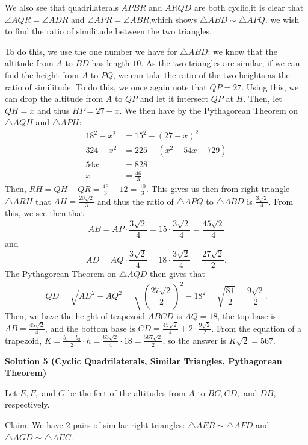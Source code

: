 \begin{enumerate}
 We also see that quadrilaterals $APBR$ and $ARQD$ are both cyclic,it is clear that $\angle AQR =\angle ADR$ and $\angle APR =\angle ABR$,which shows $\triangle ABD \sim \triangle APQ$. we wish to find the ratio of similitude between the two triangles.

 To do this, we use the one number we have for $\triangle ABD$: we know that the altitude from $A$ to $BD$ has length $10$. As the two triangles are similar, if we can find the height from $A$ to $PQ$, we can take the ratio of the two heights as the ratio of similitude. To do this, we once again note that $QP = 27$. Using this, we can drop the altitude from $A$ to $QP$ and let it intersect $QP$ at $H$. Then, let $QH = x$ and thus $HP=27-x$. We then have by the Pythagorean Theorem on $\triangle AQH$ and $\triangle APH$:
 \begin{align*} 18^2 - x^2 &= 15^2 - (27-x)^2 \\ 324 - x^2 &= 225 - (x^2-54x+729) \\ 54x &= 828 \\ x &= \frac{46}{3}. \end{align*}
Then, $RH = QH - QR = \frac{46}{3} - 12 = \frac{10}{3}$. This gives us then from right triangle $\triangle ARH$ that $AH = \frac{20\sqrt{2}}{3}$ and thus the ratio of $\triangle APQ$ to $\triangle ABD$ is $\frac{3\sqrt{2}}{4}$. From this, we see then that 
 \[AB = AP \cdot \frac{3\sqrt{2}}{4} = 15 \cdot \frac{3\sqrt{2}}{4} = \frac{45\sqrt{2}}{4}\] and 
 \[AD = AQ \cdot \frac{3\sqrt{2}}{4} = 18 \cdot \frac{3\sqrt{2}}{4} = \frac{27\sqrt{2}}{2}.\] The Pythagorean Theorem on $\triangle AQD$ then gives that 
 \[QD = \sqrt{AD^2 - AQ^2} = \sqrt{\left(\frac{27\sqrt{2}}{2}\right)^2 - 18^2} = \sqrt{\frac{81}{2}} = \frac{9\sqrt{2}}{2}.\]Then, we have the height of trapezoid $ABCD$ is $AQ = 18$, the top base is $AB = \frac{45\sqrt{2}}{4}$, and the bottom base is $CD = \frac{45\sqrt{2}}{4} + 2\cdot\frac{9\sqrt{2}}{2}$. From the equation of a trapezoid, $K = \frac{b_1+b_2}{2} \cdot h = \frac{63\sqrt{2}}{4} \cdot 18 = \frac{567\sqrt{2}}{2}$, so the answer is $K\sqrt{2} = \boxed{567}$.

 



\textbf{Solution 5 (Cyclic Quadrilaterals, Similar Triangles, Pythagorean Theorem)}

Let $E,F,$ and $G$ be the feet of the altitudes from $A$ to $BC,CD,$ and $DB$, respectively.

 Claim: We have $2$ pairs of similar right triangles: $\triangle AEB \sim \triangle AFD$ and $\triangle AGD \sim \triangle AEC$.


\end{enumerate}
